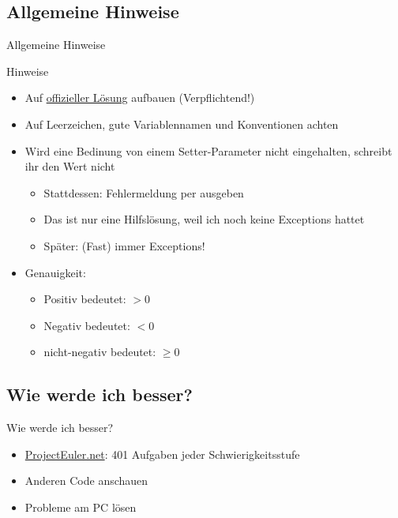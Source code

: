 \documentclass[usepdftitle=false,hyperref={pdfpagelabels=false}]{beamer}
\begin{document}
\subsection{Allgemeine Hinweise}
\begin{frame}{Allgemeine Hinweise}
    \begin{alertblock}{Hinweise}
        \begin{itemize}[<+->]
            \item Auf \href{http://baldur.iti.kit.edu/programmieren/}{offizieller Lösung} aufbauen (Verpflichtend!)
            \item Auf Leerzeichen, gute Variablennamen und Konventionen achten
            \item Wird eine Bedinung von einem Setter-Parameter nicht eingehalten, schreibt ihr den Wert nicht
            \begin{itemize}
                \item Stattdessen: Fehlermeldung per  ausgeben
                \item Das ist nur eine Hilfslösung, weil ich noch keine Exceptions hattet
                \item Später: (Fast) immer Exceptions!
            \end{itemize}
            \item Genauigkeit:
            \begin{itemize}
                \item Positiv bedeutet: $> 0$
                \item Negativ bedeutet: $< 0$
                \item nicht-negativ bedeutet: $\geq 0$
            \end{itemize}
        \end{itemize}
    \end{alertblock}
\end{frame}

\subsection{Wie werde ich besser?}
\begin{frame}{Wie werde ich besser?}
    \begin{itemize}
        \item \href{http://projecteuler.net/}{ProjectEuler.net}:
              401 Aufgaben jeder Schwierigkeitsstufe
        \item Anderen Code anschauen
        \item Probleme am PC lösen
    \end{itemize}
\end{frame}
\end{document}
